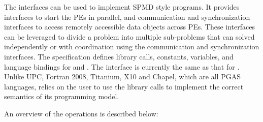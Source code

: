 
The \openshmem{} interfaces can be used to implement \ac{SPMD} style programs. It provides interfaces to start the \openshmem{} \ac{PE}s in parallel, and communication and synchronization interfaces to access remotely accessible data objects across \ac{PE}s. These interfaces can be leveraged to divide a problem into multiple sub-problems that can solved independently or with coordination using the communication and synchronization interfaces.
The \openshmem specification defines library calls, constants, variables, and language bindings for \Clang{} and \Fortran{}.
The \Cpp{} interface is currently the same as that for \Clang. Unlike UPC, Fortran 2008, Titanium, X10 and Chapel, which are all PGAS languages, \openshmem relies on 
the user to use the library calls  to implement the correct semantics of its programming model.

An overview of the \openshmem operations is described below:

